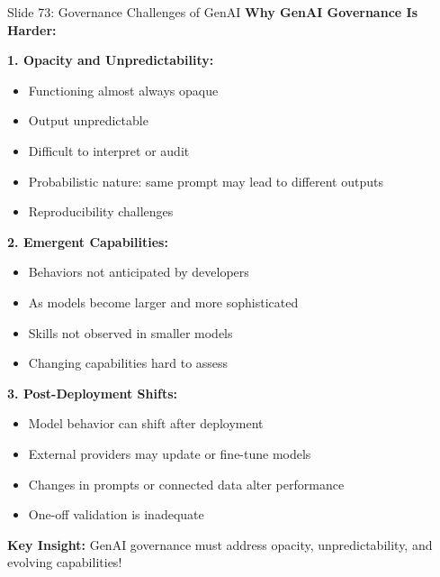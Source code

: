 \documentclass[8pt]{beamer}
\begin{document}
	\begin{frame}{Slide 73: Governance Challenges of GenAI}
		\fontsize{6.5}{7.5}\selectfont
		\textbf{Why GenAI Governance Is Harder:}
		
		\vspace{0.1cm}
		\textbf{1. Opacity and Unpredictability:}
		\begin{itemize}
			\item Functioning almost always opaque
			\item Output unpredictable
			\item Difficult to interpret or audit
			\item Probabilistic nature: same prompt may lead to different outputs
			\item Reproducibility challenges
		\end{itemize}
		
		\vspace{0.1cm}
		\textbf{2. Emergent Capabilities:}
		\begin{itemize}
			\item Behaviors not anticipated by developers
			\item As models become larger and more sophisticated
			\item Skills not observed in smaller models
			\item Changing capabilities hard to assess
		\end{itemize}
		
		\vspace{0.1cm}
		\textbf{3. Post-Deployment Shifts:}
		\begin{itemize}
			\item Model behavior can shift after deployment
			\item External providers may update or fine-tune models
			\item Changes in prompts or connected data alter performance
			\item One-off validation is inadequate
		\end{itemize}
		
		\textcolor{myblue}{\textbf{Key Insight:}} GenAI governance must address \textcolor{myblue}{opacity, unpredictability, and evolving capabilities}!
	\end{frame}
	
\end{document}
